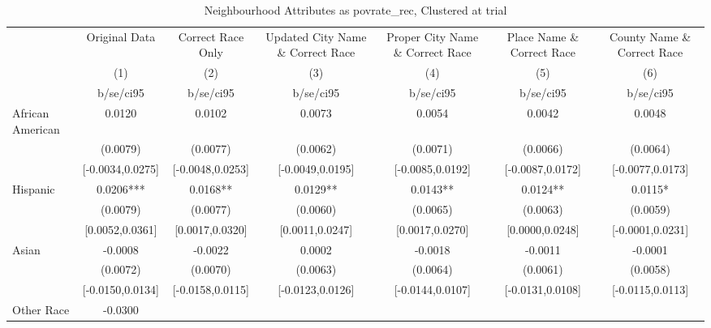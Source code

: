 \documentclass{article}
\begin{document}
\begin{table}[htbp]\centering
\def\sym#1{\ifmmode^{#1}\else\(^{#1}\)\fi}
\caption{Neighbourhood Attributes as povrate\_rec, Clustered at trial}
\begin{tabular}{l*{6}{c}}
\toprule
                    &\multicolumn{1}{c}{Original Data}&\multicolumn{1}{c}{Correct Race Only}&\multicolumn{1}{c}{Updated City Name \& Correct Race}&\multicolumn{1}{c}{Proper City Name \& Correct Race}&\multicolumn{1}{c}{Place Name \& Correct Race}&\multicolumn{1}{c}{County Name \& Correct Race}\\\cmidrule(lr){2-2}\cmidrule(lr){3-3}\cmidrule(lr){4-4}\cmidrule(lr){5-5}\cmidrule(lr){6-6}\cmidrule(lr){7-7}
                    &\multicolumn{1}{c}{(1)}   &\multicolumn{1}{c}{(2)}   &\multicolumn{1}{c}{(3)}   &\multicolumn{1}{c}{(4)}   &\multicolumn{1}{c}{(5)}   &\multicolumn{1}{c}{(6)}   \\
                    &   b/se/ci95   &   b/se/ci95   &   b/se/ci95   &   b/se/ci95   &   b/se/ci95   &   b/se/ci95   \\
\midrule
African American    &      0.0120   &      0.0102   &      0.0073   &      0.0054   &      0.0042   &      0.0048   \\
                    &    (0.0079)   &    (0.0077)   &    (0.0062)   &    (0.0071)   &    (0.0066)   &    (0.0064)   \\
                    &[-0.0034,0.0275]   &[-0.0048,0.0253]   &[-0.0049,0.0195]   &[-0.0085,0.0192]   &[-0.0087,0.0172]   &[-0.0077,0.0173]   \\
Hispanic            &      0.0206***&      0.0168** &      0.0129** &      0.0143** &      0.0124** &      0.0115*  \\
                    &    (0.0079)   &    (0.0077)   &    (0.0060)   &    (0.0065)   &    (0.0063)   &    (0.0059)   \\
                    &[0.0052,0.0361]   &[0.0017,0.0320]   &[0.0011,0.0247]   &[0.0017,0.0270]   &[0.0000,0.0248]   &[-0.0001,0.0231]   \\
Asian               &     -0.0008   &     -0.0022   &      0.0002   &     -0.0018   &     -0.0011   &     -0.0001   \\
                    &    (0.0072)   &    (0.0070)   &    (0.0063)   &    (0.0064)   &    (0.0061)   &    (0.0058)   \\
                    &[-0.0150,0.0134]   &[-0.0158,0.0115]   &[-0.0123,0.0126]   &[-0.0144,0.0107]   &[-0.0131,0.0108]   &[-0.0115,0.0113]   \\
Other Race          &     -0.0300   &               &               &               &               &               \\

\end{tabular}
\end{table}
\end{document}
